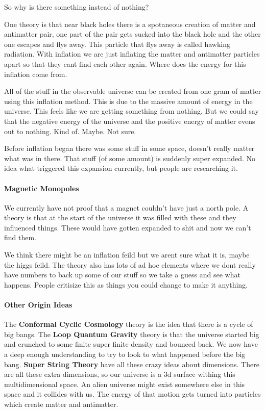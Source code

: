 \documentclass{article}
\begin{document}
So why is there something instead of nothing?

One theory is that near black holes there is a spotaneous creation of matter and antimatter pair, one part of the pair gets sucked into the black hole and the other one escapes and flys away. This particle that flys away is called hawking radiation. With inflation we are just inflating the matter and antimatter particles apart so that they cant find each other again. Where does the energy for this inflation come from.

All of the stuff in the observable universe can be created from one gram of matter using this inflation method. This is due to the massive amount of energy in the universe. This feels like we are getting something from nothing. But we could say that the negative energy of the universe and the positive energy of matter evens out to nothing. Kind of. Maybe. Not sure.

Before inflation began there was some stuff in some space, doesn't really matter what was in there. That stuff (of some amount) is suddenly super expanded. No idea what triggered this expansion currently, but people are researching it.

\paragraph{Magnetic Monopoles}
\label{par:magnetic_monopoles}
We currently have not proof that a magnet couldn't have just a north pole. A theory is that at the start of the universe it was filled with these and they influenced things. These would have gotten expanded to shit and now we can't find them.

We think there might be an inflation feild but we arent sure what it is, maybe the higgs feild. The theory also has lots of ad hoc elements where we dont really have numbers to back up some of our stuff so we take a guess and see what happens. People critisize this as things you could change to make it anything.

\paragraph{Other Origin Ideas}
\label{par:other_origin_ideas}
The \textbf{Conformal Cyclic Cosmology} theory is the idea that there is a cycle of big bangs. The \textbf{Loop Quantum Gravity} theory is that the universe started big and crunched to some finite super finite density and bounced back. We now have a deep enough understanding to try to look to what happened before the big bang. \textbf{Super String Theory} have all these crazy ideas about dimensions. There are all these extra dimensions, so our universe is a 3d surface withing this multidimensional space. An alien universe might exist somewhere else in this space and it collides with us. The energy of that motion gets turned into particles which create matter and antimatter.
\end{document}
